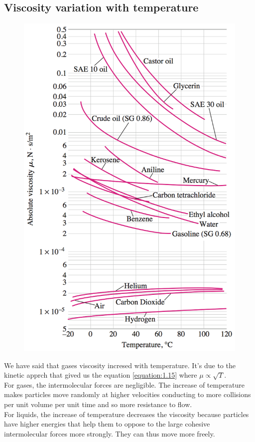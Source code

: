\subsection{Viscosity variation with temperature}
\label{subsec:viscogas}
	\begin{figure}
	\vspace{-10mm}
	\includegraphics[scale=0.25]{ch1/10}
	\end{figure}
	We have said that gases viscosity incresed with temperature. It's due to the kinetic apprch that gived us the equation \eqref{equation:1.15} where $\mu \propto \sqrt{T}$. \\
	For gases, the intermolecular forces are negligible. The increase of temperature makes particles move randomly at higher velocities conducting to more collisions per unit volume per unit time and so more resistance to flow. \\
	For liquids, the increase of temperature decreases the viscosity because particles have higher energies that help them to oppose to the large cohesive intermolecular forces more strongly. They can thus move more freely. 

